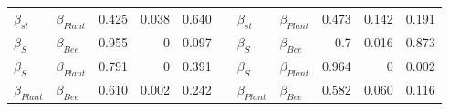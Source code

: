 \documentclass[11pt]{article}
\begin{document}
\begin{table}[h]
{\begin{tabular}{|l|l|r|r|r|l|l|l|r|r|r|}
$\beta_{st}$ & $\beta_{Plant}$ & 0.425 & 0.038 & 0.640 &  & $\beta_{st}$ & $\beta_{Plant}$ & 0.473 & 0.142 & 0.191 \\ \cline{1-5} \cline{7-11} 
$\beta_{S}$ & $\beta_{Bee}$ & 0.955 & 0 & 0.097 &  & $\beta_{S}$ & $\beta_{Bee}$ & 0.7 & 0.016 & 0.873 \\ \cline{1-5} \cline{7-11} 
$\beta_{S}$ & $\beta_{Plant}$ & 0.791 & 0 & 0.391 &  & $\beta_{S}$ & $\beta_{Plant}$ & 0.964 & 0 & 0.002 \\ \cline{1-5} \cline{7-11} 
$\beta_{Plant}$ & $\beta_{Bee}$ & 0.610 & 0.002 & 0.242 &  & $\beta_{Plant}$ & $\beta_{Bee}$ & 0.582 & 0.060 & 0.116 \\ \cline{1-5} \cline{7-11} 
\end{tabular}%
}
\end{table}
\vspace*{\fill}
\end{document}
